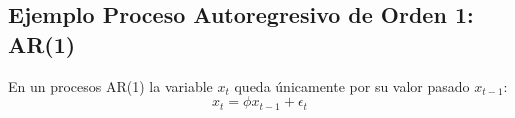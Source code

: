 

\subsection{Ejemplo Proceso Autoregresivo de Orden 1: AR(1)}

En un procesos AR(1) la variable $x_t$ queda \'unicamente por su valor pasado $x_{t-1}$:
\begin{equation}
x_t = \phi x_{t-1} + \epsilon_t
\end{equation}

